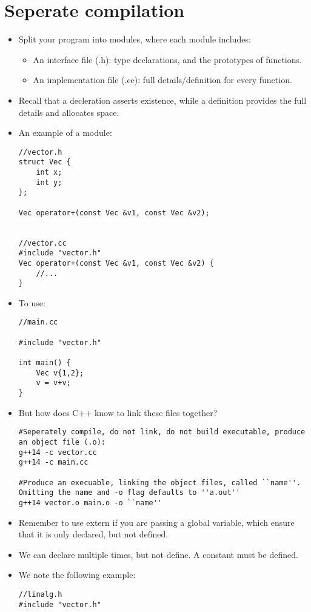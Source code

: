 \documentclass{article}
\begin{document}
\section{Seperate compilation}
\begin{itemize}
\item Split your program into modules, where each module includes:
\begin{itemize}
\item An interface file (.h): type declarations, and the prototypes of functions.
\item An implementation file (.cc): full details/definition for every function.
\end{itemize}
\item Recall that a decleration asserts existence, while a definition provides the full details and allocates space.
\item An example of a module:
\begin{lstlisting}
//vector.h
struct Vec {
    int x;
    int y;
};

Vec operator+(const Vec &v1, const Vec &v2);


//vector.cc
#include "vector.h"
Vec operator+(const Vec &v1, const Vec &v2) {
    //...
}
\end{lstlisting}
\item To use:
\begin{lstlisting}
//main.cc

#include "vector.h"

int main() {
    Vec v{1,2};
    v = v+v;
}
\end{lstlisting}
\item But how does C++ know to link these files together?
\begin{lstlisting}
#Seperately compile, do not link, do not build executable, produce an object file (.o):
g++14 -c vector.cc
g++14 -c main.cc

#Produce an execuable, linking the object files, called ``name''.  Omitting the name and -o flag defaults to ''a.out''
g++14 vector.o main.o -o ``name''
\end{lstlisting}
\item Remember to use extern if you are passing a global variable, which ensure that it is only declared, but not defined.
\item We can declare multiple times, but not define.  A constant must be defined.
\item We note the following example:
\begin{lstlisting}
//linalg.h
#include "vector.h"


\end{lstlisting}
\end{itemize}
\end{document}
